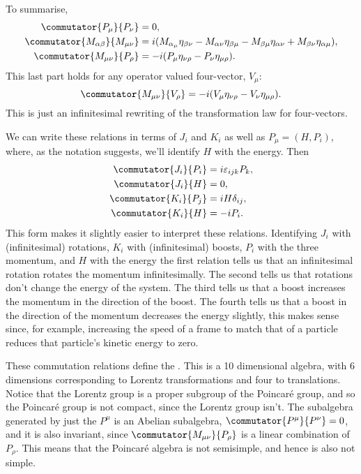 \documentclass[fleqn]{NotesClass}
\newcommand{\minkowskiMetric}{\eta}
\begin{document}
    To summarise,
    \begin{align}
        \commutator{P_\mu}{P_\nu} &= 0,\\
        \commutator{M_{\alpha\beta}}{M_{\mu\nu}} &= i(M_{\alpha_\mu} \minkowskiMetric_{\beta\nu} - M_{\alpha\nu} \minkowskiMetric_{\beta\mu} - M_{\beta\mu} \minkowskiMetric_{\alpha\nu} + M_{\beta\nu} \minkowskiMetric_{\alpha\mu}),\\
        \commutator{M_{\mu\nu}}{P_\rho} &= -i(P_\mu \minkowskiMetric_{\nu\rho} - P_{\nu}\minkowskiMetric_{\mu\rho}).
    \end{align}
    This last part holds for any operator valued four-vector, \(V_\mu\):
    \begin{equation}
        \commutator{M_{\mu\nu}}{V_\rho} = -i(V_\mu \minkowskiMetric_{\nu\rho} - V_{\nu}\minkowskiMetric_{\mu\rho}).
    \end{equation}
    This is just an infinitesimal rewriting of the transformation law for four-vectors.
    
    We can write these relations in terms of \(J_i\) and \(K_i\) as well as \(P_\mu = (H, P_i)\), where, as the notation suggests, we'll identify \(H\) with the energy.
    Then
    \begin{align}
        \commutator{J_i}{P_i} &= i\varepsilon_{ijk}P_k,\\
        \commutator{J_i}{H} &= 0,\\
        \commutator{K_i}{P_j} &= iH\delta_{ij},\\
        \commutator{K_i}{H} &= -iP_i.
    \end{align}
    This form makes it slightly easier to interpret these relations.
    Identifying \(J_i\) with (infinitesimal) rotations, \(K_i\) with (infinitesimal) boosts, \(P_i\) with the three momentum, and \(H\) with the energy the first relation tells us that an infinitesimal rotation rotates the momentum infinitesimally.
    The second tells us that rotations don't change the energy of the system.
    The third tells us that a boost increases the momentum in the direction of the boost.
    The fourth tells us that a boost in the direction of the momentum decreases the energy slightly, this makes sense since, for example, increasing the speed of a frame to match that of a particle reduces that particle's kinetic energy to zero.
    
    These commutation relations define the .
    This is a 10 dimensional algebra, with 6 dimensions corresponding to Lorentz transformations and four to translations.
    Notice that the Lorentz group is a proper subgroup of the Poincar\'e group, and so the Poincar\'e group is not compact, since the Lorentz group isn't.
    The subalgebra generated by just the \(P^\mu\) is an Abelian subalgebra, \(\commutator{P^\mu}{P^\nu} = 0\), and it is also invariant, since \(\commutator{M_{\mu\nu}}{P_\rho}\) is a linear combination of \(P_\rho\).
    This means that the Poincar\'e algebra is not semisimple, and hence is also not simple.
    
\end{document}
